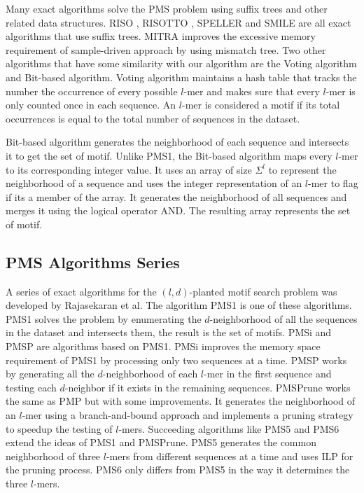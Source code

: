 Many exact algorithms solve the PMS problem using suffix trees and other related data structures. RISO \cite{Carvalho05ahighly}, RISOTTO \cite{Pisanti06risotto}, SPELLER \cite{Sagot98spellingapproximate} and SMILE are all exact algorithms that use suffix trees. MITRA \cite{eskin2002finding} improves the excessive memory requirement of sample-driven approach by using mismatch tree. Two other algorithms that have some similarity with our algorithm are the Voting algorithm and Bit-based algorithm. Voting algorithm \cite{Chin2005} maintains a hash table that tracks the number the occurrence of every possible $l$-mer and makes sure that every $l$-mer is only counted once in each sequence. An $l$-mer is considered a motif if its total occurrences is equal to the total number of sequences in the dataset.

Bit-based algorithm \cite{dasari2010efficient} generates the neighborhood of each sequence and intersects it to get the set of motif. Unlike PMS1, the Bit-based algorithm maps every $l$-mer to its corresponding integer value. It uses an array of size $\Sigma^l$ to represent the neighborhood of a sequence and uses the integer representation of an $l$-mer to flag if its a member of the array. It generates the neighborhood of all sequences and merges it using the logical operator AND. The resulting array represents the set of motif.


\subsection{PMS Algorithms Series}
A series of exact algorithms for the $(l, d)$-planted motif search problem was developed by Rajasekaran et al. The algorithm PMS1 \cite{ExactAlgorithmsPMS} is one of these algorithms. PMS1 solves the problem by enumerating the $d$-neighborhood of all the sequences in the dataset and intersects them, the result is the set of motifs. PMSi and PMSP \cite{Davila2006} are algorithms based on PMS1. PMSi improves the memory space requirement of PMS1 by processing only two sequences at a time. PMSP works by generating all the $d$-neighborhood of each $l$-mer in the first sequence and testing each $d$-neighbor if it exists in the remaining sequences. PMSPrune \cite{pms2007} works the same as PMP but with some improvements. It generates the neighborhood of an $l$-mer using a branch-and-bound approach and implements a pruning strategy to speedup the testing of $l$-mers. Succeeding algorithms like PMS5 \cite{Dinh2011} and PMS6 \cite{Shibdas2014} extend the ideas of PMS1 and PMSPrune. PMS5 generates the common neighborhood of three $l$-mers from different sequences at a time and uses ILP for the pruning process. PMS6 only differs from PMS5 in the way it determines the three $l$-mers.

